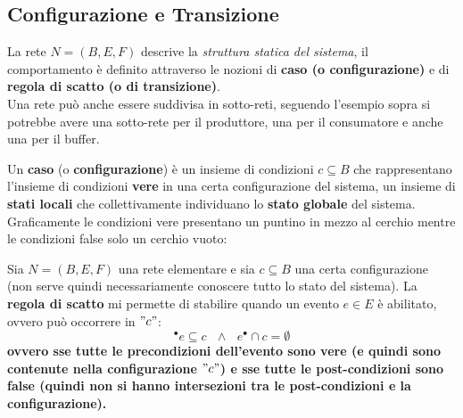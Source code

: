 \subsection{Configurazione e Transizione}
La rete $N=(B, E, F)$ descrive la \textit{struttura statica del sistema}, il
comportamento è definito attraverso le nozioni di \textbf{caso (o
  configurazione)} e di \textbf{regola di scatto (o di transizione)}.\\
Una rete può anche essere suddivisa in sotto-reti, seguendo l'esempio sopra si
potrebbe avere una sotto-rete per il produttore, una per il consumatore e anche
una per il buffer.\\
\begin{definizione}
  Un \textbf{caso} (o \textbf{configurazione}) è un insieme di condizioni
  $c\subseteq B$ che rappresentano l’insieme di condizioni \textbf{vere} in una certa
  configurazione del sistema, un insieme di \textbf{stati locali} che
  collettivamente individuano lo \textbf{stato globale} del sistema.\\
  Graficamente le condizioni vere presentano un puntino in mezzo al cerchio
  mentre le condizioni false solo un cerchio vuoto:
  \begin{center}
  \end{center}
\end{definizione} \vspace{5mm} %
\begin{definizione}
  Sia $N=(B, E, F)$ una rete elementare e sia $c\subseteq B$ una certa
  configurazione (non serve quindi necessariamente conoscere tutto lo stato del
  sistema). La \textbf{regola di scatto} mi permette di stabilire quando
  un evento $e\in E$ è abilitato, ovvero può occorrere in $"c"$:
  \[^\bullet e\subseteq c \,\,\,\,\land\,\,\,\, e^\bullet \cap c = \emptyset\]
  \textbf{ovvero sse tutte le precondizioni dell'evento sono vere (e quindi sono
  contenute nella configurazione $"c"$) e sse tutte le post-condizioni sono false
  (quindi non si hanno intersezioni tra le post-condizioni e la
  configurazione).} \\
\end{definizione} \vspace{5mm} %

